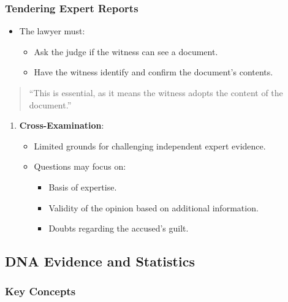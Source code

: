 \subsubsection{Tendering Expert Reports}\label{tendering-expert-reports}

\begin{itemize}
\tightlist
\item
  The lawyer must:

  \begin{itemize}
  \tightlist
  \item
    Ask the judge if the witness can see a document.
  \item
    Have the witness identify and confirm the document's contents.
  \end{itemize}
\end{itemize}

\begin{quote}
``This is essential, as it means the witness adopts the content of the
document.''
\end{quote}

\begin{enumerate}
\def\labelenumi{\arabic{enumi}.}
\setcounter{enumi}{3}
\tightlist
\item
  \textbf{Cross-Examination}:

  \begin{itemize}
  \tightlist
  \item
    Limited grounds for challenging independent expert evidence.
  \item
    Questions may focus on:

    \begin{itemize}
    \tightlist
    \item
      Basis of expertise.
    \item
      Validity of the opinion based on additional information.
    \item
      Doubts regarding the accused's guilt.
    \end{itemize}
  \end{itemize}
\end{enumerate}

\subsection{ DNA Evidence and
Statistics}\label{dna-evidence-and-statistics}

\subsubsection{Key Concepts}\label{key-concepts-1}

